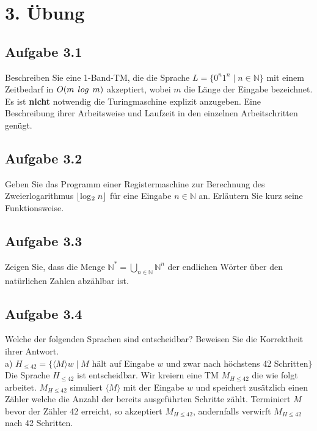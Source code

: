 \section*{3. Übung}
\subsection*{Aufgabe 3.1}
Beschreiben Sie eine 1-Band-TM, die die Sprache $L = \{0^n1^n \mid n \in \mathbb{N}\}$ mit einem Zeitbedarf in $O(m \hspace{0,15cm} log \hspace{0,15cm} m)$ akzeptiert, wobei $m$ die Länge der Eingabe bezeichnet.\\
Es ist \textbf{nicht} notwendig die Turingmaschine explizit anzugeben. Eine Beschreibung ihrer Arbeitsweise und Laufzeit in den einzelnen Arbeitschritten genügt.
\subsection*{Aufgabe 3.2} Geben Sie das Programm einer Registermaschine zur Berechnung des Zweierlogarithmus $\lfloor $log$_2 \hspace{0,1cm} n \rfloor$ für eine Eingabe $n \in \mathbb{N}$ an. Erläutern Sie kurz seine Funktionsweise.
\subsection*{Aufgabe 3.3}
Zeigen Sie, dass die Menge $\mathbb{N}^* = \bigcup_{n \in \mathbb{N}} \mathbb{N}^n$ der endlichen Wörter über den natürlichen Zahlen abzählbar ist.
\subsection*{Aufgabe 3.4}
Welche der folgenden Sprachen sind entscheidbar? Beweisen Sie die Korrektheit ihrer Antwort.\\
a) $H_{\leq 42} = \{\langle M \rangle w \mid M$ hält auf Eingabe $w$ und zwar nach höchstens 42 Schritten$\}$\\

Die Sprache $H_{\leq 42}$ ist entscheidbar. Wir kreiern eine 
TM $M_{H \leq 42}$ die wie folgt arbeitet. $M_{H \leq 42}$
 simuliert $\langle M \rangle$ mit der Eingabe $w$ und 
speichert zusätzlich einen Zähler welche die Anzahl der bereits
ausgeführten Schritte
zählt. Terminiert $M$ bevor der Zähler 42 erreicht, so akzeptiert
$M_{H \leq 42}$, andernfalls verwirft $M_{H \leq 42}$ nach 42
Schritten.\\

